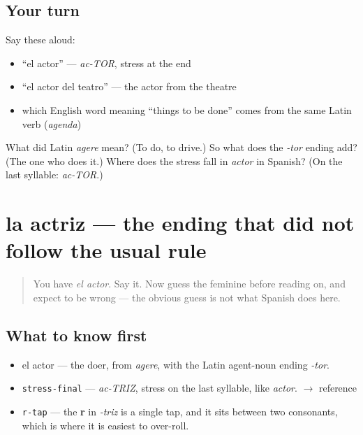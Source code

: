 \subsection*{Your turn}
Say these aloud:

\begin{itemize}
\raggedright
  \item \textquotedblleft{}el actor\textquotedblright{} — \emph{ac-TOR}, stress at the end
  \item \textquotedblleft{}el actor del teatro\textquotedblright{} — the actor from the theatre
  \item which English word meaning \textquotedblleft{}things to be done\textquotedblright{} comes from the same Latin verb (\emph{agenda})
\end{itemize}

\begin{tcolorbox}[breakable,colback=teal!4,colframe=teal!35!black,title={Before you move on}]
What did Latin \emph{agere} mean? (To do, to drive.) So what does the \emph{-tor} ending add? (The one who does it.) Where does the stress fall in \emph{actor} in Spanish? (On the last syllable: \emph{ac-TOR}.)
\end{tcolorbox}
\section[la actriz]{la actriz — the ending that did not follow the usual rule}

\label{lesson:ES-C421-actriz}



\begin{quote}
You have \emph{el actor}. Say it. Now guess the feminine before reading on, and expect to be wrong — the obvious guess is not what Spanish does here.
\end{quote}

\subsection*{What to know first}
\begin{itemize}
\raggedright
  \item el actor — the doer, from \emph{agere}, with the Latin agent-noun ending \emph{-tor}.
\end{itemize}

\begin{sounds}
\begin{itemize}
\raggedright
  \item \texttt{stress-final} — \emph{ac-TRIZ}, stress on the last syllable, like \emph{actor}. $\to$ reference
  \item \texttt{r-tap} — the \textbf{r} in \emph{-triz} is a single tap, and it sits between two consonants, which is where it is easiest to over-roll.
\end{itemize}
\end{sounds}

